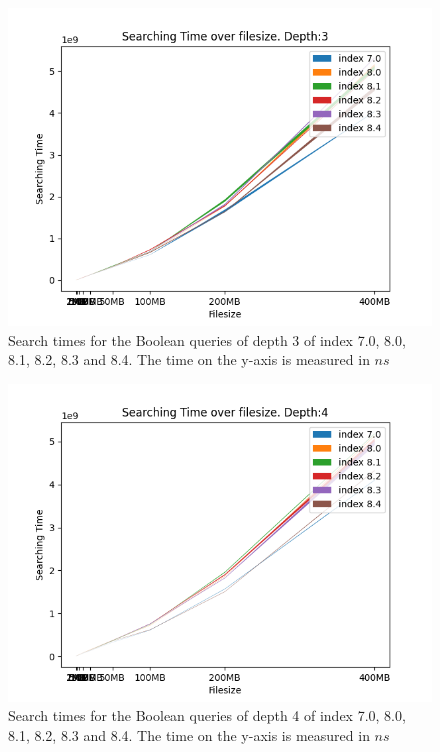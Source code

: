 \begin{figure}[H]
    \centering
    \includegraphics[width=.8\textwidth]{LaTeX/Pictures/Results/BooleanSearchDepth2.png}
    \caption{Search times for the Boolean queries of depth 3 of index 7.0, 8.0, 8.1, 8.2, 8.3 and 8.4. The time on the y-axis is measured in $ns$}
    \label{fig:BPindextime23452}
\end{figure}

\begin{figure}[H]
    \centering
    \includegraphics[width=.8\textwidth]{LaTeX/Pictures/Results/BooleanSearchDepth3.png}
    \caption{Search times for the Boolean queries of depth 4 of index 7.0, 8.0, 8.1, 8.2, 8.3 and 8.4. The time on the y-axis is measured in $ns$}
    \label{fig:BPindextime23453}
\end{figure}

